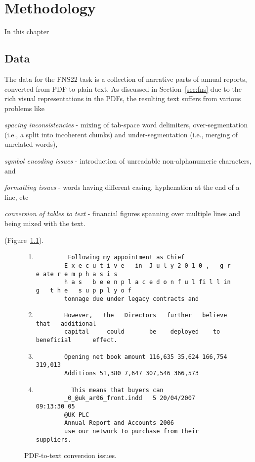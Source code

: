 \chapter{Methodology}\label{ch:methodology}
In this chapter

\section{Data}\label{sec:data}
The data for the FNS22 task is a collection of narrative parts of annual reports, converted from PDF to plain text.
As discussed in Section~\ref{sec:fns} due to the rich visual representations in the PDFs, the resulting text suffers from various problems like
\begin{enumerate*}[label=(\alph*)]
    \item \emph{spacing inconsistencies} - mixing of tab-space word delimiters, over-segmentation (i.e., a split into incoherent chunks) and under-segmentation (i.e., merging of unrelated words),
    \item \emph{symbol encoding issues} - introduction of unreadable non-alphanumeric characters, and
    \item \emph{formatting issues} - words having different casing, hyphenation at the end of a line, etc
    \item \emph{conversion of tables to text} - financial figures spanning over multiple lines and being mixed with the text.
\end{enumerate*} (Figure~\ref{fig:pdf_to_text}).

\begin{figure}[ht]
    \centering
    \begin{enumerate}
        \item \begin{verbatim}
         Following my appointment as Chief
        E x e c u t i v e	in	J u l y	2 0 1 0 ,	g r e ate r	e m p h a s i s
        h a s	b e e n	p l a c e d	o n	f u l fi l l in g	t h e	s u p p l y	o f
        tonnage due under legacy contracts and
    \end{verbatim}
    \item \begin{verbatim}
        However,   the   Directors   further   believe   that   additional
        capital   	could   	be	  deployed	  to 	beneficial   	effect.
    \end{verbatim}
    \item \begin{verbatim}
        Opening net book amount 116,635 35,624 166,754 319,013
        Additions 51,380 7,647 307,546 366,573
    \end{verbatim}
    \item \begin{verbatim}
          This means that buyers can
        _0_@uk_ar06_front.indd   5 20/04/2007   09:13:30 05
        @UK PLC
        Annual Report and Accounts 2006
        use our network to purchase from their suppliers.
    \end{verbatim}
    \end{enumerate}
    \caption{PDF-to-text conversion issues.}
    \label{fig:pdf_to_text}
\end{figure}

